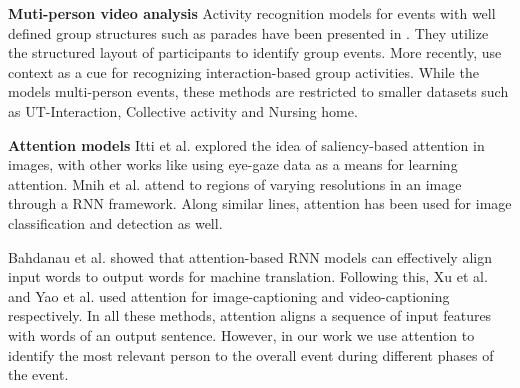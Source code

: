 
\noindent \textbf{Muti-person video analysis}
Activity recognition models for events with well defined group structures such
as parades have been presented in
\cite{Vaswani_CVPR03,Intille_CVIU01,Moore_AAAI02,Khan_ACM05}.  They utilize the
structured layout of participants to identify group events. More
recently, \cite{Lan_PAMI12,Choi_ICCV09,Khodabandeh_arxiv15} use context as a
cue for recognizing interaction-based group activities.  While the  models
multi-person events, these methods are restricted to smaller
datasets such as UT-Interaction\cite{Ryoo_10}, Collective activity
\cite{Choi_ICCV09} and Nursing home\cite{Lan_PAMI12}.

\noindent \textbf{Attention models}
Itti et al. \cite{Itti_PAMI98} explored the idea of saliency-based attention in
images, with other works like \cite{Shapovalova_NIPS13} using eye-gaze data as
a means for learning attention.  Mnih et al. \cite{Mnih_NIPS14} attend to
regions of varying resolutions in an image through a RNN framework.  Along
similar lines, attention has been used for image classification
\cite{Cao_ICCV15,Gregor_arxiv15,Xiao_arxiv14} and detection
\cite{Ba_arxiv14,Caicedo_ICCV15,Yoo_arxiv15} as well.

Bahdanau et al. \cite{Bahdnau_arxiv14} showed that attention-based RNN models
can effectively align input words to output words for machine translation.
Following this, Xu et al. \cite{Xu_arxiv15} and Yao et al. \cite{Yao_arxiv15}
used attention for image-captioning and video-captioning respectively.
 In all these methods,
attention aligns a sequence of input features with words of an output sentence.
However, in our work we use attention to identify the most relevant person to
the overall event during different phases of the event.


